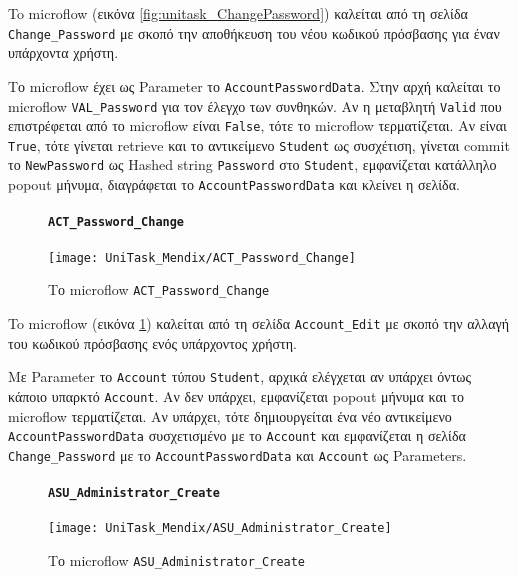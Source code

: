                     To microflow (εικόνα \ref{fig:unitask_ChangePassword}) καλείται από τη σελίδα \texttt{Change\_Password} με σκοπό την αποθήκευση του νέου κωδικού πρόσβασης για έναν υπάρχοντα χρήστη.

                    Το microflow έχει ως Parameter το \texttt{AccountPasswordData}. Στην αρχή καλείται το microflow \texttt{VAL\_Password} για τον έλεγχο των συνθηκών. Αν η μεταβλητή \texttt{Valid} που επιστρέφεται από το microflow είναι \texttt{False}, τότε το microflow τερματίζεται. Αν είναι \texttt{True}, τότε γίνεται retrieve και το αντικείμενο \texttt{Student} ως συσχέτιση, γίνεται commit το \texttt{NewPassword} ως Hashed string \texttt{Password} στο \texttt{Student}, εμφανίζεται κατάλληλο popout μήνυμα, διαγράφεται το \texttt{AccountPasswordData} και κλείνει η σελίδα.

                \newpage

                \begin{figure}[H] \noindent
                    \paragraph{\texttt{ACT\_Password\_Change}}
                    \begin{center}
                        \texttt{[image: UniTask\_Mendix/ACT\_Password\_Change]}
                        \caption{\centering Το microflow \texttt{ACT\_Password\_Change}}
                        \label{fig:unitask_ACT_Password_Change}
                    \end{center}
                \end{figure}

                    To microflow (εικόνα \ref{fig:unitask_ACT_Password_Change}) καλείται από τη σελίδα \texttt{Account\_Edit} με σκοπό την αλλαγή του κωδικού πρόσβασης ενός υπάρχοντος χρήστη.

                    Με Parameter το \texttt{Account} τύπου \texttt{Student}, αρχικά ελέγχεται αν υπάρχει όντως κάποιο υπαρκτό \texttt{Account}. Αν δεν υπάρχει, εμφανίζεται popout μήνυμα και το microflow τερματίζεται. Αν υπάρχει, τότε δημιουργείται ένα νέο αντικείμενο \texttt{AccountPasswordData} συσχετισμένο με το \texttt{Account} και εμφανίζεται η σελίδα \texttt{Change\_Password} με το \texttt{AccountPasswordData} και \texttt{Account} ως Parameters.

                \begin{figure}[H] \noindent
                    \paragraph{\texttt{ASU\_Administrator\_Create}}
                    \begin{center}
                        \texttt{[image: UniTask\_Mendix/ASU\_Administrator\_Create]}
                        \caption{\centering Το microflow \texttt{ASU\_Administrator\_Create}}
                        \label{fig:unitask_ASU_Administrator_Create}
                    \end{center}
                \end{figure}

